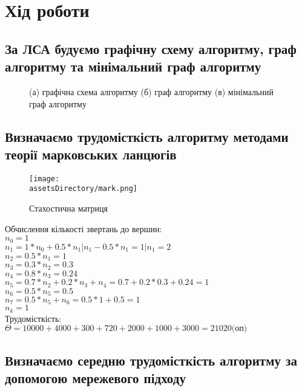 \section{Хід роботи}
\subsection{За ЛСА будуємо графічну схему алгоритму, граф алгоритму та мінімальний граф алгоритму}
\begin{figure}[ht!]
    \centering
    \caption{(а) графічна схема алгоритму (б) граф алгоритму (в) мінімальний граф алгоритму}
\end{figure}


\newpage
\subsection{Визначаємо трудомісткість алгоритму методами теорії марковських ланцюгів}

\begin{figure}[ht!]
    \centering
    \texttt{[image: \\assetsDirectory/mark.png]}
    \caption{Стахостична матриця}
\end{figure}

\noindent
Обчислення кількості звертань до вершин:\\
$n_0 = 1$\\
$n_1 = 1 * n_0 + 0.5 * n_1 | n_1 - 0.5 * n_1 = 1 | n_1 = 2$\\
$n_2 = 0.5 * n_1 = 1$\\
$n_3 = 0.3 * n_2 = 0.3$\\
$n_4 = 0.8 * n_3 = 0.24$\\
$n_5 = 0.7 * n_2 + 0.2 * n_3 + n_4 = 0.7 + 0.2 * 0.3 + 0.24 = 1$\\
$n_6 = 0.5 * n_5 = 0.5$\\
$n_7 = 0.5 * n_5 + n_6 = 0.5 *1 + 0.5 = 1$\\
$n_k = 1$\\

\noindent
Трудомісткість:\\
$\Theta = 10000 + 4000 + 300 + 720 + 2000 + 1000 + 3000 = 21020 \text{(оп)}$\\



\newpage
\subsection{Визначаємо середню трудомісткість алгоритму за допомогою мережевого підходу}

